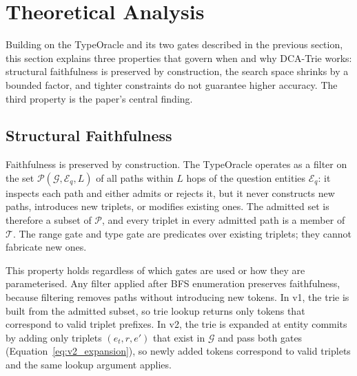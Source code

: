 
\section{Theoretical Analysis}
\label{sec:theoretical}

Building on the TypeOracle and its two gates described in the previous section, this
section explains three properties that govern when and why DCA-Trie works: structural
faithfulness is preserved by construction, the search space shrinks by a bounded
factor, and tighter constraints do not guarantee higher accuracy. The third property
is the paper's central finding.

\subsection{Structural Faithfulness}
\label{sec:theoretical:faithfulness}

Faithfulness is preserved by construction. The TypeOracle operates as a filter on the
set $\mathcal{P}(\mathcal{G}, \mathcal{E}_q, L)$ of all paths within $L$ hops of the
question entities $\mathcal{E}_q$: it inspects each path and either admits or rejects
it, but it never constructs new paths, introduces new triplets, or modifies existing
ones. The admitted set is therefore a subset of $\mathcal{P}$, and every triplet in
every admitted path is a member of $\mathcal{T}$. The range gate and type gate are
predicates over existing triplets; they cannot fabricate new ones.

This property holds regardless of which gates are used or how they are parameterised.
Any filter applied after BFS enumeration preserves faithfulness, because filtering
removes paths without introducing new tokens. In v1, the trie is built from the
admitted subset, so trie lookup returns only tokens that correspond to valid triplet
prefixes. In v2, the trie is expanded at entity commits by adding only triplets
$(e_t, r, e')$ that exist in $\mathcal{G}$ and pass both gates
(Equation~\ref{eq:v2_expansion}), so newly added tokens correspond to valid triplets
and the same lookup argument applies.


